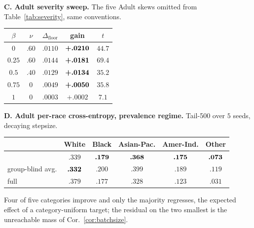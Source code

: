 \medskip
\noindent\textbf{C. Adult severity sweep.} The five Adult skews omitted from
Table~\ref{tab:severity}, same conventions.
\begin{center}\footnotesize\setlength{\tabcolsep}{4pt}
\begin{tabular}{ccccc}
\toprule
$\beta$ & $\nu$ & $\Delta_{\mathrm{floor}}$ & gain & $t$ \\
\midrule
$0$    & $.60$ & $.0110$ & $\textbf{+.0210}$ & $44.7$ \\
$0.25$ & $.60$ & $.0144$ & $\textbf{+.0181}$ & $69.4$ \\
$0.5$  & $.40$ & $.0129$ & $\textbf{+.0134}$ & $35.2$ \\
$0.75$ & $0$   & $.0049$ & $\textbf{+.0050}$ & $35.8$ \\
$1$    & $0$   & $.0003$ & $+.0002$ & $7.1$ \\
\bottomrule
\end{tabular}
\end{center}

\medskip
\noindent\textbf{D. Adult per-race cross-entropy, prevalence regime.}
Tail-500 over $5$ seeds, decaying stepsize.
\begin{center}\footnotesize\setlength{\tabcolsep}{4pt}
\begin{tabular}{lccccc}
\toprule
 & White & Black & Asian-Pac. & Amer-Ind. & Other \\
\midrule
\avot{}            & $.339$ & $\textbf{.179}$ & $\textbf{.368}$ & $\textbf{.175}$ & $\textbf{.073}$ \\
group-blind avg.   & $\textbf{.332}$ & $.200$ & $.399$ & $.189$ & $.119$ \\
full               & $.379$ & $.177$ & $.328$ & $.123$ & $.031$ \\
\bottomrule
\end{tabular}
\end{center}
Four of five categories improve and only the majority regresses, the expected
effect of a category-uniform target; the residual on the two smallest is the
unreachable mass of Cor.~\ref{cor:batchsize}.
